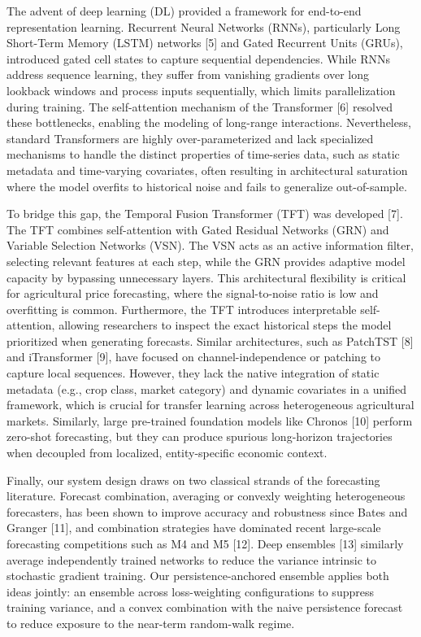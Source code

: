 \documentclass[review,3p,times]{elsarticle}
\begin{document}
The advent of deep learning (DL) provided a framework for end-to-end representation learning. Recurrent Neural Networks (RNNs), particularly Long Short-Term Memory (LSTM) networks [5] and Gated Recurrent Units (GRUs), introduced gated cell states to capture sequential dependencies. While RNNs address sequence learning, they suffer from vanishing gradients over long lookback windows and process inputs sequentially, which limits parallelization during training. The self-attention mechanism of the Transformer [6] resolved these bottlenecks, enabling the modeling of long-range interactions. Nevertheless, standard Transformers are highly over-parameterized and lack specialized mechanisms to handle the distinct properties of time-series data, such as static metadata and time-varying covariates, often resulting in architectural saturation where the model overfits to historical noise and fails to generalize out-of-sample.

To bridge this gap, the Temporal Fusion Transformer (TFT) was developed [7]. The TFT combines self-attention with Gated Residual Networks (GRN) and Variable Selection Networks (VSN). The VSN acts as an active information filter, selecting relevant features at each step, while the GRN provides adaptive model capacity by bypassing unnecessary layers. This architectural flexibility is critical for agricultural price forecasting, where the signal-to-noise ratio is low and overfitting is common. Furthermore, the TFT introduces interpretable self-attention, allowing researchers to inspect the exact historical steps the model prioritized when generating forecasts. Similar architectures, such as PatchTST [8] and iTransformer [9], have focused on channel-independence or patching to capture local sequences. However, they lack the native integration of static metadata (e.g., crop class, market category) and dynamic covariates in a unified framework, which is crucial for transfer learning across heterogeneous agricultural markets. Similarly, large pre-trained foundation models like Chronos [10] perform zero-shot forecasting, but they can produce spurious long-horizon trajectories when decoupled from localized, entity-specific economic context.

Finally, our system design draws on two classical strands of the forecasting literature. Forecast combination, averaging or convexly weighting heterogeneous forecasters, has been shown to improve accuracy and robustness since Bates and Granger [11], and combination strategies have dominated recent large-scale forecasting competitions such as M4 and M5 [12]. Deep ensembles [13] similarly average independently trained networks to reduce the variance intrinsic to stochastic gradient training. Our persistence-anchored ensemble applies both ideas jointly: an ensemble across loss-weighting configurations to suppress training variance, and a convex combination with the naive persistence forecast to reduce exposure to the near-term random-walk regime.
\end{document}

